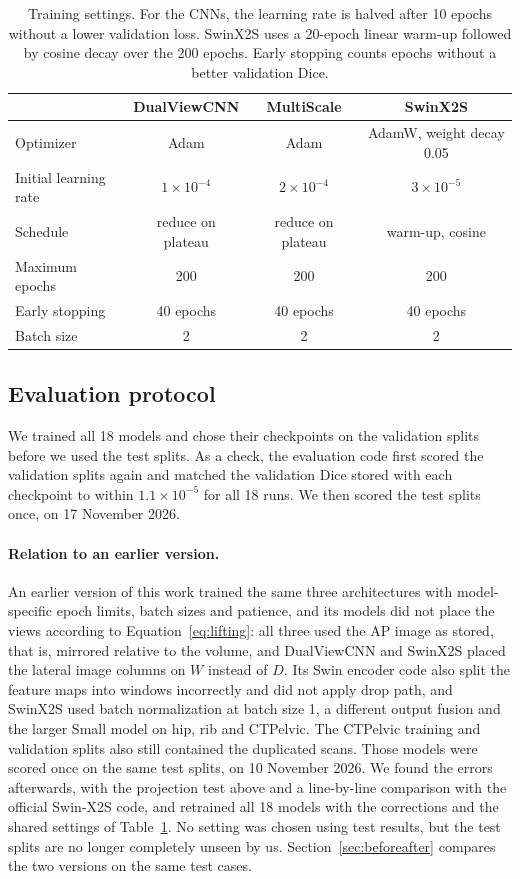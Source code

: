 \documentclass[11pt]{article}
\begin{document}
\begin{table}[t]
\centering
\caption{Training settings. For the CNNs, the learning rate is halved after 10 epochs without a lower validation loss. SwinX2S uses a 20-epoch linear warm-up followed by cosine decay over the 200 epochs. Early stopping counts epochs without a better validation Dice.}
\label{tab:training}
\small
\begin{tabular}{@{}lccc@{}}
\toprule
 & DualViewCNN & MultiScale & SwinX2S \\
\midrule
Optimizer & Adam & Adam & AdamW, weight decay 0.05 \\
Initial learning rate & $1\times10^{-4}$ & $2\times10^{-4}$ & $3\times10^{-5}$ \\
Schedule & reduce on plateau & reduce on plateau & warm-up, cosine \\
Maximum epochs & 200 & 200 & 200 \\
Early stopping & 40 epochs & 40 epochs & 40 epochs \\
Batch size & 2 & 2 & 2 \\
\bottomrule
\end{tabular}
\end{table}

\subsection{Evaluation protocol}
We trained all 18 models and chose their checkpoints on the validation splits before we used the test splits. As a check, the evaluation code first scored the validation splits again and matched the validation Dice stored with each checkpoint to within $1.1\times10^{-5}$ for all 18 runs. We then scored the test splits once, on 17 November 2026.

\paragraph{Relation to an earlier version.} An earlier version of this work trained the same three architectures with model-specific epoch limits, batch sizes and patience, and its models did not place the views according to Equation~\eqref{eq:lifting}: all three used the AP image as stored, that is, mirrored relative to the volume, and DualViewCNN and SwinX2S placed the lateral image columns on $W$ instead of $D$. Its Swin encoder code also split the feature maps into windows incorrectly and did not apply drop path, and SwinX2S used batch normalization at batch size 1, a different output fusion and the larger Small model on hip, rib and CTPelvic. The CTPelvic training and validation splits also still contained the duplicated scans. Those models were scored once on the same test splits, on 10 November 2026. We found the errors afterwards, with the projection test above and a line-by-line comparison with the official Swin-X2S code, and retrained all 18 models with the corrections and the shared settings of Table~\ref{tab:training}. No setting was chosen using test results, but the test splits are no longer completely unseen by us. Section~\ref{sec:beforeafter} compares the two versions on the same test cases.
\end{document}
